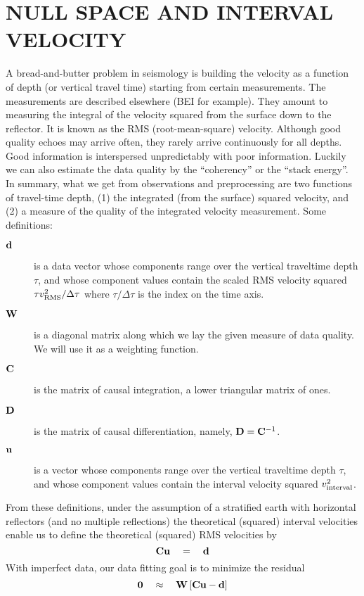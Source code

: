 \section{NULL SPACE AND INTERVAL VELOCITY}
A bread-and-butter problem in seismology is building the velocity
as a function of depth (or vertical travel time)
starting from certain measurements.
The measurements are described elsewhere (BEI for example).
They amount to measuring the integral of the velocity squared
from the surface down to the reflector.
It is known as the RMS (root-mean-square) velocity.
Although good quality echoes may arrive often,
they rarely arrive continuously for all depths.
Good information is interspersed unpredictably with poor information.
Luckily we can
also estimate
the data quality by the ``coherency'' or the
``stack energy''.
In summary, what we get from observations and preprocessing
are two functions of travel-time depth,
(1) the integrated (from the surface) squared velocity, and
(2) a measure of the quality of the integrated velocity measurement.
Some definitions:
\begin{description}
\item  [$\bold d$]
is a data vector whose components range over the vertical
traveltime depth $\tau$,
and whose component values contain the scaled RMS velocity squared
$\tau v_{\rm RMS}^2/\Delta \tau $
where
$\tau /\Delta \tau $ is the index on the time axis.
\item [$\bold W$]
is a diagonal matrix along which we lay the given measure
of data quality.  We will use it as a weighting function.
\item  [$\bold C$]
is the matrix of causal integration, a lower triangular matrix of ones.
\item  [$\bold D$]
is the matrix of causal differentiation, namely, $\bold D=\bold C^{-1}$.
\item [$\bold u$]
is a vector whose components range over the vertical
traveltime depth $\tau$,
and whose component values contain the interval velocity squared
$v_{\rm interval}^2 $.
\end{description}
From these definitions,
under the assumption of a stratified earth with horizontal reflectors
(and no multiple reflections)
the theoretical (squared) interval velocities
enable us to define the theoretical (squared) RMS velocities by
\begin{equation}
\bold C\bold u \quad =\quad \bold d 
\end{equation}
With imperfect data, our data fitting goal is to minimize the residual
\begin{equation}
\bold 0
\quad\approx\quad
\bold W
\left[
\bold C\bold u
-
\bold d
\right]
\end{equation}
